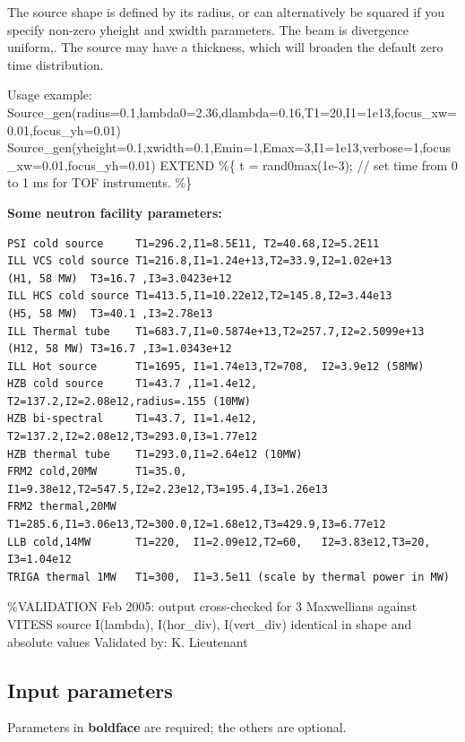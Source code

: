 The source shape is defined by its radius, or can alternatively be squared if you specify non-zero yheight and xwidth parameters. The beam is divergence uniform,. The source may have a thickness, which will broaden the default zero time distribution.

Usage example: Source\_gen(radius=0.1,lambda0=2.36,dlambda=0.16,T1=20,I1=1e13,focus\_xw=0.01,focus\_yh=0.01) Source\_gen(yheight=0.1,xwidth=0.1,Emin=1,Emax=3,I1=1e13,verbose=1,focus\_xw=0.01,focus\_yh=0.01) EXTEND \%\{ t = rand0max(1e-3); // set time from 0 to 1 ms for TOF instruments. \%\}

\textbf{Some neutron facility parameters:}

\begin{verbatim}
PSI cold source     T1=296.2,I1=8.5E11, T2=40.68,I2=5.2E11
ILL VCS cold source T1=216.8,I1=1.24e+13,T2=33.9,I2=1.02e+13
(H1, 58 MW)  T3=16.7 ,I3=3.0423e+12
ILL HCS cold source T1=413.5,I1=10.22e12,T2=145.8,I2=3.44e13
(H5, 58 MW)  T3=40.1 ,I3=2.78e13
ILL Thermal tube    T1=683.7,I1=0.5874e+13,T2=257.7,I2=2.5099e+13
(H12, 58 MW) T3=16.7 ,I3=1.0343e+12
ILL Hot source      T1=1695, I1=1.74e13,T2=708,  I2=3.9e12 (58MW)
HZB cold source     T1=43.7 ,I1=1.4e12, T2=137.2,I2=2.08e12,radius=.155 (10MW)
HZB bi-spectral     T1=43.7, I1=1.4e12, T2=137.2,I2=2.08e12,T3=293.0,I3=1.77e12
HZB thermal tube    T1=293.0,I1=2.64e12 (10MW)
FRM2 cold,20MW      T1=35.0, I1=9.38e12,T2=547.5,I2=2.23e12,T3=195.4,I3=1.26e13
FRM2 thermal,20MW   T1=285.6,I1=3.06e13,T2=300.0,I2=1.68e12,T3=429.9,I3=6.77e12
LLB cold,14MW       T1=220,  I1=2.09e12,T2=60,   I2=3.83e12,T3=20,   I3=1.04e12
TRIGA thermal 1MW   T1=300,  I1=3.5e11 (scale by thermal power in MW)
\end{verbatim}

\%VALIDATION Feb 2005: output cross-checked for 3 Maxwellians against VITESS source I(lambda), I(hor\_div), I(vert\_div) identical in shape and absolute values Validated by: K. Lieutenant

\subsection*{Input parameters}
Parameters in \textbf{boldface} are required; the others are optional.

